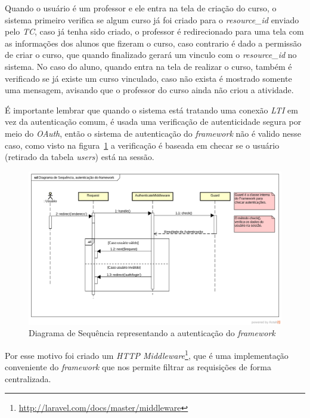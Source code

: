 Quando o usuário é um professor e ele entra na tela de criação do curso, o sistema primeiro verifica se algum curso já foi criado para o \textit{resource\_id} enviado pelo \textit{TC}, caso já tenha sido criado, o professor é redirecionado para uma tela com as informações dos alunos que fizeram o curso, caso contrario é dado a permissão de criar o curso, que quando finalizado gerará um vinculo com o \textit{resource\_id} no sistema. No caso do aluno, quando entra na tela de realizar o curso, também é verificado se já existe um curso vinculado, caso não exista é mostrado somente uma mensagem, avisando que o professor do curso ainda não criou a atividade.

É importante lembrar que quando o sistema está tratando uma conexão \textit{LTI} em vez da autenticação comum, é usada uma verificação de autenticidade segura por meio do \textit{OAuth}, então o sistema de autenticação do \textit{framework} não é valido nesse caso, como visto na figura~\ref{fig:diagrama-sequencia-autenticacao} a verificação é baseada em checar se o usuário (retirado da tabela \textit{users}) está na sessão. 

\begin{figure}[htbp]
    \centering
    \includegraphics[keepaspectratio=true,scale=0.45]{figuras/diagrama_sequencia_autenticacao.png}
    \caption{Diagrama de Sequência representando a autenticação do \textit{framework}}
    \label{fig:diagrama-sequencia-autenticacao}
\end{figure}

Por esse motivo foi criado um \textit{HTTP Middleware}\footnote{\url{http://laravel.com/docs/master/middleware}}, que é uma implementação conveniente do \textit{framework} que nos permite filtrar as requisições de forma centralizada.

